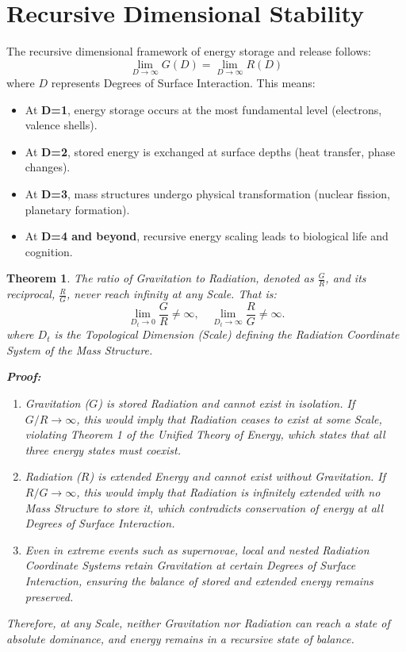 \documentclass{article}
\newtheorem{theorem}{Theorem} %
\begin{document}
\section{Recursive Dimensional Stability}
The recursive dimensional framework of energy storage and release follows:
\begin{equation}
    \lim_{D \to \infty} G(D) = \lim_{D \to \infty} R(D)
\end{equation}
where $D$ represents Degrees of Surface Interaction. This means:
\begin{itemize}
    \item At \textbf{D=1}, energy storage occurs at the most fundamental level (electrons, valence shells).
    \item At \textbf{D=2}, stored energy is exchanged at surface depths (heat transfer, phase changes).
    \item At \textbf{D=3}, mass structures undergo physical transformation (nuclear fission, planetary formation).
    \item At \textbf{D=4 and beyond}, recursive energy scaling leads to biological life and cognition.
\end{itemize}

\begin{theorem}
    The ratio of Gravitation to Radiation, denoted as \( \frac{G}{R} \), and its reciprocal, \( \frac{R}{G} \), never reach infinity at any Scale. That is:
    \begin{equation}
        \lim_{D_t \to 0} \frac{G}{R} \neq \infty, \quad \lim_{D_t \to \infty} \frac{R}{G} \neq \infty.
    \end{equation}
    where \( D_t \) is the Topological Dimension (Scale) defining the Radiation Coordinate System of the Mass Structure.
    
    \textbf{Proof:}  
    \begin{enumerate}
        \item Gravitation (\( G \)) is stored Radiation and cannot exist in isolation. If \( G/R \to \infty \), this would imply that Radiation ceases to exist at some Scale, violating Theorem 1 of the Unified Theory of Energy, which states that all three energy states must coexist.
        \item Radiation (\( R \)) is extended Energy and cannot exist without Gravitation. If \( R/G \to \infty \), this would imply that Radiation is infinitely extended with no Mass Structure to store it, which contradicts conservation of energy at all Degrees of Surface Interaction.
        \item Even in extreme events such as supernovae, local and nested Radiation Coordinate Systems retain Gravitation at certain Degrees of Surface Interaction, ensuring the balance of stored and extended energy remains preserved.
    \end{enumerate}
    Therefore, at any Scale, neither Gravitation nor Radiation can reach a state of absolute dominance, and energy remains in a recursive state of balance.
\end{theorem}
\end{document}
